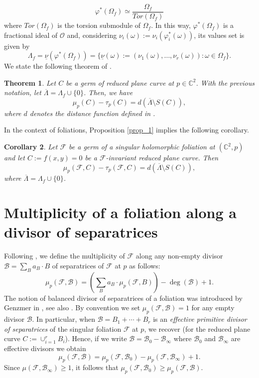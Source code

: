 \documentclass[11pt]{amsart}
\newcommand{\C}{\mathbb{C}}
\newcommand{\F}{\mathcal{F}}
\newtheorem{theorem}{Theorem}[section]
\newtheorem{corollary}[theorem]{Corollary}
\begin{document}
\[\varphi^{*}(\Omega_f)\simeq\frac{\Omega_f}{Tor(\Omega_f)}\]
where $Tor(\Omega_f)$ is the torsion submodule of $\Omega_f$. In this way, $\varphi^{*}(\Omega_f)$ is a fractional ideal of $\mathcal{O}$ and, considering $\nu_i(\omega):=\nu_i(\varphi^{*}_i(\omega))$, its values set is given by 
\[\varLambda_f=\underline{\nu}(\varphi^{*}(\Omega_f))=\{\underline{\nu}(\omega):=(\nu_1(\omega),\ldots,\nu_r(\omega)):\omega\in\Omega_f\}.\]
We state the following theorem of \cite[Theorem 2.9]{A-H}.
\begin{theorem}
Let $C$ be a germ of reduced plane curve at $p\in\C^2$. With the previous notation, let $\overline{\varLambda}=\varLambda_f\cup \{0\}$. Then, we have
\[\mu_p(C)-\tau_p(C)=d(\overline{\varLambda}\setminus S(C)),\]
where $d$ denotes the distance function defined in \cite[Section 2.1]{A-H}.
\end{theorem}
In the context of foliations, Proposition \ref{prop_1} implies the following corollary.
\begin{corollary}
Let $\F$ be a germ of a singular holomorphic foliation at $(\C^2,p)$ and let $C:=f(x,y)=0$ be a $\F$-invariant reduced plane curve.  Then 
\[\mu_p(\F,C)-\tau_p(\F,C)=d(\overline{\varLambda}\setminus S(C)),\]
where $\overline{\varLambda}=\varLambda_f\cup \{0\}$.
\end{corollary}


\section{Multiplicity of a foliation along a divisor of separatrices}\label{multi} 
Following \cite[Section 2]{FP-GB-SM2024}, we define the multiplicity of  $\mathcal{F}$ along any non-empty divisor 
$\mathcal{B}=\sum_{B} a_B\cdot B$ of separatrices of $\mathcal F$ at $p$ as follows:
\begin{equation}\label{eq:gmul}
\mu_{p}(\mathcal{F},\mathcal{B})=\left(\displaystyle\sum_{B}a_{B}\cdot \mu_{p}(\mathcal{F},B)\right)-\deg(\mathcal{B})+1.
\end{equation}
The notion of balanced divisor of separatrices of a foliation was introduced by Genzmer in \cite{Genzmer}, see also \cite{Genzmer-Mol}.
By convention we set $\mu_{p}(\mathcal{F},\mathcal{B})=1$ for any empty divisor $\mathcal{B}$.
In particular, when $\mathcal{B}=B_1+\cdots+B_r$ is an \textit{effective primitive divisor of separatrices} of the singular foliation $\mathcal{F}$ at $p$, we recover \cite[Equation (2.2), p. 329]{K-S} (for the reduced plane curve $C:=\cup_{i=1}^rB_i$).
 Hence, if we write $\mathcal B=\mathcal B_0-\mathcal B_{\infty}$ where $\mathcal B_0$ and $\mathcal B_{\infty}$ are effective divisors we obtain
\begin{equation}\label{mudivisor}
\mu_{p}(\mathcal{F},\mathcal{B})=\mu_{p}(\mathcal{F},\mathcal{B}_0)-\mu_{p}(\mathcal{F},\mathcal{B}_{\infty})+1.
\end{equation}
\noindent Since $\mu(\mathcal F, \mathcal B_{\infty})\geq 1$, it follows that
$\mu_{p}(\mathcal{F},\mathcal{B}_0)\geq \mu_{p}(\mathcal{F},\mathcal{B}).$ 
\end{document}

